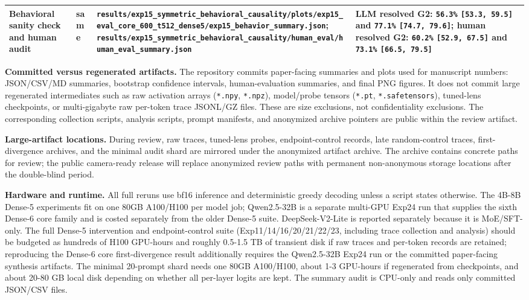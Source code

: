 \documentclass[11pt]{article}
\begin{document}
\begin{table}[t]
\begin{tabularx}{\linewidth}{@{}>{\raggedright\arraybackslash}X >{\raggedright\arraybackslash}X >{\raggedright\arraybackslash}X >{\raggedright\arraybackslash}X@{}}
Behavioral sanity check and human audit & same & \texttt{results/exp15\_symmetric\_behavioral\_causality/plots/exp15\_eval\_core\_600\_t512\_dense5/exp15\_behavior\_summary.json}; \texttt{results/exp15\_symmetric\_behavioral\_causality/human\_eval/human\_eval\_summary.json} & LLM resolved G2: \texttt{56.3\%} \texttt{[53.3, 59.5]} and \texttt{77.1\%} \texttt{[74.7, 79.6]}; human resolved G2: \texttt{60.2\%} \texttt{[52.9, 67.5]} and \texttt{73.1\%} \texttt{[66.5, 79.5]} \\
\bottomrule
\end{tabularx}
\end{table}

\textbf{Committed versus regenerated artifacts.} The repository commits paper-facing summaries and plots used for manuscript numbers: JSON/CSV/MD summaries, bootstrap confidence intervals, human-evaluation summaries, and final PNG figures. It does not commit large regenerated intermediates such as raw activation arrays (\texttt{*.npy}, \texttt{*.npz}), model/probe tensors (\texttt{*.pt}, \texttt{*.safetensors}), tuned-lens checkpoints, or multi-gigabyte raw per-token trace JSONL/GZ files. These are size exclusions, not confidentiality exclusions. The corresponding collection scripts, analysis scripts, prompt manifests, and anonymized archive pointers are public within the review artifact.

\textbf{Large-artifact locations.} During review, raw traces, tuned-lens probes, endpoint-control records, late random-control traces, first-divergence archives, and the minimal audit shard are mirrored under the anonymized artifact archive. The archive contains concrete paths for review; the public camera-ready release will replace anonymized review paths with permanent non-anonymous storage locations after the double-blind period.

\textbf{Hardware and runtime.} All full reruns use bf16 inference and deterministic greedy decoding unless a script states otherwise. The 4B-8B Dense-5 experiments fit on one 80GB A100/H100 per model job; Qwen2.5-32B is a separate multi-GPU Exp24 run that supplies the sixth Dense-6 core family and is costed separately from the older Dense-5 suite. DeepSeek-V2-Lite is reported separately because it is MoE/SFT-only. The full Dense-5 intervention and endpoint-control suite (Exp11/14/16/20/21/22/23, including trace collection and analysis) should be budgeted as hundreds of H100 GPU-hours and roughly 0.5-1.5 TB of transient disk if raw traces and per-token records are retained; reproducing the Dense-6 core first-divergence result additionally requires the Qwen2.5-32B Exp24 run or the committed paper-facing synthesis artifacts. The minimal 20-prompt shard needs one 80GB A100/H100, about 1-3 GPU-hours if regenerated from checkpoints, and about 20-80 GB local disk depending on whether all per-layer logits are kept. The summary audit is CPU-only and reads only committed JSON/CSV files.
\end{document}
